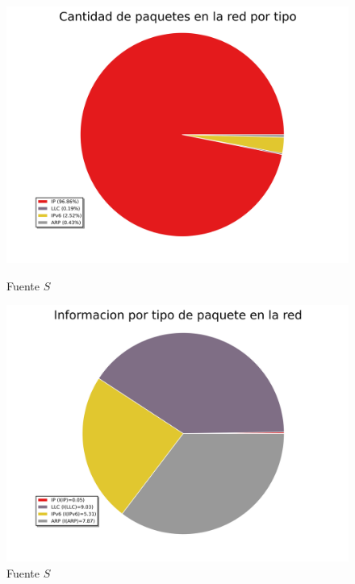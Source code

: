\begin{figure}[ht!]
  \centering
  \begin{minipage}[b]{0.48\textwidth}
    \includegraphics[width=\textwidth]{graficos/galerias_pacifico3_10min_pie_type.png}
    \caption{Fuente $S$}
    \label{fig:galerias_pacifico3_10min_pie_type}
  \end{minipage}
  \hfill
  \begin{minipage}[b]{0.48\textwidth}
    \includegraphics[width=\textwidth]{graficos/galerias_pacifico3_10min_pie_type_information.png}
    \caption{Fuente $S$}
    \label{fig:galerias_pacifico3_10min_pie_type_information}
  \end{minipage}
\end{figure}

